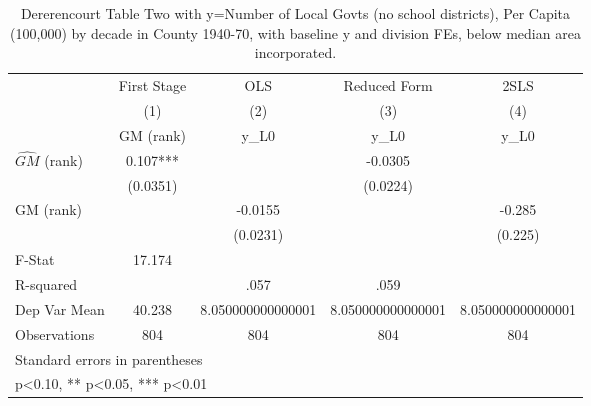 \begin{table}[htbp]\centering
\def\sym#1{\ifmmode^{#1}\else\(^{#1}\)\fi}
\caption{Dererencourt Table Two with y=Number of Local Govts (no school districts), Per Capita (100,000) by decade in County 1940-70, with baseline y and division FEs, below median area incorporated.}
\begin{tabular}{l*{4}{c}}
\toprule
                    & First Stage   &         OLS   &Reduced Form   &        2SLS   \\
                    &\multicolumn{1}{c}{(1)}&\multicolumn{1}{c}{(2)}&\multicolumn{1}{c}{(3)}&\multicolumn{1}{c}{(4)}\\
                    &\multicolumn{1}{c}{GM  (rank)}&\multicolumn{1}{c}{y\_L0}&\multicolumn{1}{c}{y\_L0}&\multicolumn{1}{c}{y\_L0}\\
\midrule
$\hat{GM}$ (rank)   &       0.107***&               &     -0.0305   &               \\
                    &    (0.0351)   &               &    (0.0224)   &               \\
\addlinespace
GM  (rank)          &               &     -0.0155   &               &      -0.285   \\
                    &               &    (0.0231)   &               &     (0.225)   \\
\midrule
F-Stat              &      17.174   &               &               &               \\
R-squared           &               &        .057   &        .059   &               \\
Dep Var Mean        &      40.238   &8.050000000000001   &8.050000000000001   &8.050000000000001   \\
Observations        &         804   &         804   &         804   &         804   \\
\bottomrule
\multicolumn{5}{l}{\footnotesize Standard errors in parentheses}\\
\multicolumn{5}{l}{\footnotesize * p<0.10, ** p<0.05, *** p<0.01}\\
\end{tabular}
\end{table}
